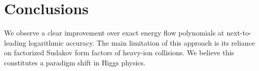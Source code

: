 \section{Conclusions}\label{sec:conclusions}

We observe a clear improvement over exact energy flow polynomials at
next-to-leading logarithmic accuracy. The main limitation of this
approach is its reliance on factorized Sudakov form factors of heavy-ion
collisions. We believe this constitutes a paradigm shift in Higgs
physics.

